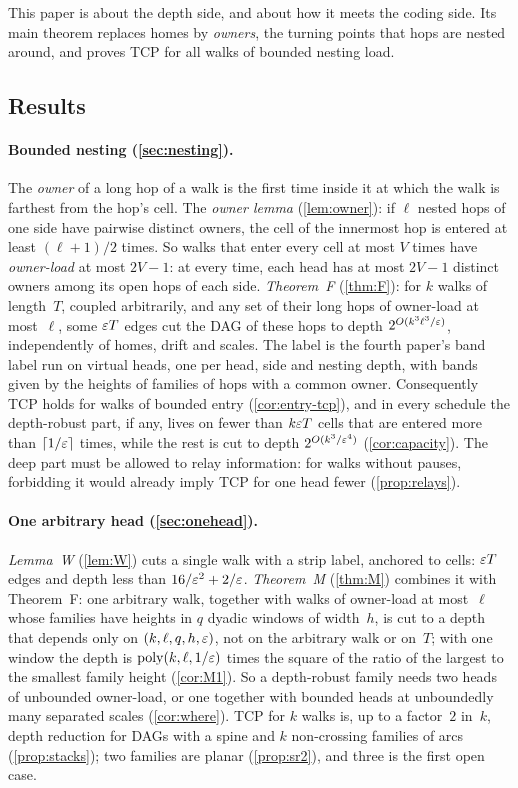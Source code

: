This paper is about the depth side, and about how it meets the coding side. Its main theorem replaces homes by
\emph{owners}, the turning points that hops are nested around, and proves TCP for all walks of bounded nesting load.

\subsection{Results}

\paragraph{Bounded nesting (\cref{sec:nesting}).} The \emph{owner} of a long hop of a walk is the first time inside it at which
the walk is farthest from the hop's cell. The \emph{owner lemma} (\cref{lem:owner}): if $\ell$ nested hops of one side have
pairwise distinct owners, the cell of the innermost hop is entered at least $(\ell+1)/2$ times. So walks that enter every cell
at most $V$ times have \emph{owner-load} at most $2V-1$: at every time, each head has at most $2V-1$ distinct owners among its open
hops of each side. \emph{Theorem~F} (\cref{thm:F}): for $k$ walks of length~$T$, coupled arbitrarily, and any set of their long
hops of owner-load at most~$\ell$, some $\varepsilon T$ edges cut the DAG of these hops to depth $2^{O(k^3\ell^3/\varepsilon)}$, independently
of homes, drift and scales. The label is the fourth paper's band label run on virtual heads, one per head, side and nesting
depth, with bands given by the heights of families of hops with a common owner. Consequently TCP holds for walks of bounded
entry (\cref{cor:entry-tcp}), and in every schedule the depth-robust part, if any, lives on fewer than $k\varepsilon T$ cells that are
entered more than $\lceil1/\varepsilon\rceil$ times, while the rest is cut to depth $2^{O(k^3/\varepsilon^4)}$ (\cref{cor:capacity}). The
deep part must be allowed to relay information: for walks without pauses, forbidding it would already imply TCP for one head
fewer (\cref{prop:relays}).

\paragraph{One arbitrary head (\cref{sec:onehead}).} \emph{Lemma~W} (\cref{lem:W}) cuts a single walk with a strip label, anchored
to cells: $\varepsilon T$ edges and depth less than $16/\varepsilon^2+2/\varepsilon$. \emph{Theorem~M} (\cref{thm:M}) combines it with Theorem~F:
one arbitrary walk, together with walks of owner-load at most~$\ell$ whose families have heights in $q$ dyadic windows of
width~$h$, is cut to a depth that depends only on $(k,\ell,q,h,\varepsilon)$, not on the arbitrary walk or on~$T$; with one window the
depth is $\operatorname{poly}(k,\ell,1/\varepsilon)$ times the square of the ratio of the largest to the smallest family height (\cref{cor:M1}). So a
depth-robust family needs two heads of unbounded owner-load, or one together with bounded heads at unboundedly many separated
scales (\cref{cor:where}). TCP for $k$ walks is, up to a factor~$2$ in~$k$, depth reduction for DAGs with a spine and $k$
non-crossing families of arcs (\cref{prop:stacks}); two families are planar (\cref{prop:sr2}), and three is the first open case.

